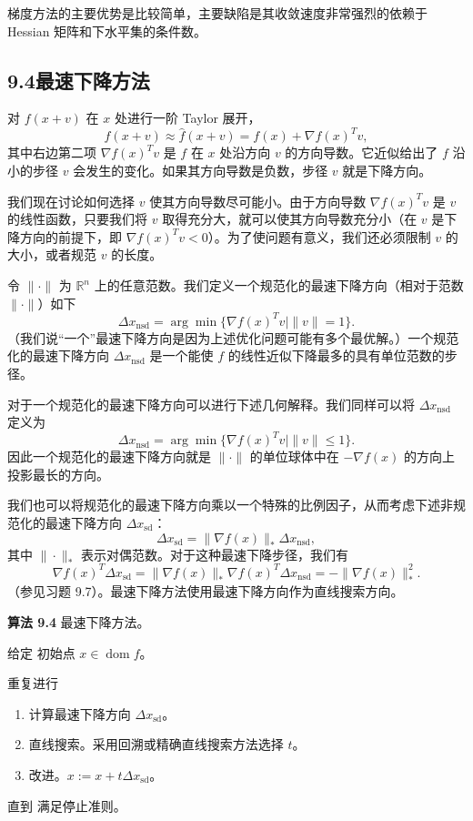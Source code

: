\documentclass[UTF8, 12pt, fontset=fandol, oneside]{ctexart}
\begin{document}
梯度方法的主要优势是比较简单，主要缺陷是其收敛速度非常强烈的依赖于 Hessian 矩阵和下水平集的条件数。

\subsection*{9.4\quad 最速下降方法}

对 $f(x+v)$ 在 $x$ 处进行一阶 Taylor 展开，
\[
f(x+v)\approx \hat{f}(x+v)=f(x)+\nabla f(x)^Tv,
\]
其中右边第二项 $\nabla f(x)^Tv$ 是 $f$ 在 $x$ 处沿方向 $v$ 的方向导数。它近似给出了 $f$ 沿小的步径 $v$ 会发生的变化。如果其方向导数是负数，步径 $v$ 就是下降方向。

我们现在讨论如何选择 $v$ 使其方向导数尽可能小。由于方向导数 $\nabla f(x)^Tv$ 是 $v$ 的线性函数，只要我们将 $v$ 取得充分大，就可以使其方向导数充分小（在 $v$ 是下降方向的前提下，即 $\nabla f(x)^Tv<0$）。为了使问题有意义，我们还必须限制 $v$ 的大小，或者规范 $v$ 的长度。

令 $\|\cdot\|$ 为 $\mathbb{R}^n$ 上的任意范数。我们定义一个规范化的最速下降方向（相对于范数 $\|\cdot\|$）如下
\begin{equation}
\Delta x_{\mathrm{nsd}}=\arg\min\{\nabla f(x)^Tv\mid \|v\|=1\}.
\tag{9.23}
\end{equation}
（我们说“一个”最速下降方向是因为上述优化问题可能有多个最优解。）一个规范化的最速下降方向 $\Delta x_{\mathrm{nsd}}$ 是一个能使 $f$ 的线性近似下降最多的具有单位范数的步径。

对于一个规范化的最速下降方向可以进行下述几何解释。我们同样可以将 $\Delta x_{\mathrm{nsd}}$ 定义为
\[
\Delta x_{\mathrm{nsd}}=\arg\min\{\nabla f(x)^Tv\mid \|v\|\leq1\}.
\]
因此一个规范化的最速下降方向就是 $\|\cdot\|$ 的单位球体中在 $-\nabla f(x)$ 的方向上投影最长的方向。

我们也可以将规范化的最速下降方向乘以一个特殊的比例因子，从而考虑下述非规范化的最速下降方向 $\Delta x_{\mathrm{sd}}$：
\begin{equation}
\Delta x_{\mathrm{sd}}=\|\nabla f(x)\|_\ast\Delta x_{\mathrm{nsd}},
\tag{9.24}
\end{equation}
其中 $\|\cdot\|_\ast$ 表示对偶范数。对于这种最速下降步径，我们有
\[
\nabla f(x)^T\Delta x_{\mathrm{sd}}
=\|\nabla f(x)\|_\ast\nabla f(x)^T\Delta x_{\mathrm{nsd}}
=-\|\nabla f(x)\|_\ast^2.
\]
（参见习题 9.7）。最速下降方法使用最速下降方向作为直线搜索方向。

\noindent\textbf{算法 9.4}\quad
最速下降方法。

给定 初始点 $x\in\operatorname{dom} f$。

重复进行
\begin{enumerate}
\item 计算最速下降方向 $\Delta x_{\mathrm{sd}}$。
\item 直线搜索。采用回溯或精确直线搜索方法选择 $t$。
\item 改进。$x:=x+t\Delta x_{\mathrm{sd}}$。
\end{enumerate}
直到 满足停止准则。
\end{document}
